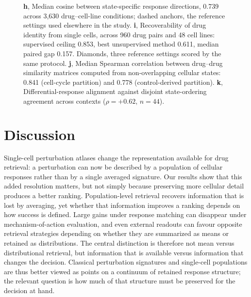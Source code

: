 \documentclass[11pt,letterpaper]{article}
\begin{document}
\begin{figure}[p]
{\textbf{h}, Median cosine between state-specific response directions, 0.739 across 3,630 drug--cell-line conditions; dashed anchors, the reference settings used elsewhere in the study.
\textbf{i}, Recoverability of drug identity from single cells, across 960 drug pairs and 48 cell lines: supervised ceiling 0.853, best unsupervised method 0.611, median paired gap 0.157. Diamonds, three reference settings scored by the same protocol.
\textbf{j}, Median Spearman correlation between drug--drug similarity matrices computed from non-overlapping cellular states: 0.841 (cell-cycle partition) and 0.778 (control-derived partition).
\textbf{k}, Differential-response alignment against disjoint state-ordering agreement across contexts ($\rho=+0.62$, $n=44$).}
\label{fig:5}
\end{figure}
\FloatBarrier   %




\section*{Discussion}

Single-cell perturbation atlases\cite{ref3,dataSciPlex3,Tahoe100M} change the representation available for drug retrieval: a perturbation can now be described by a population of cellular responses rather than by a single averaged signature. Our results show that this added resolution matters, but not simply because preserving more cellular detail produces a better ranking. Population-level retrieval recovers information that is lost by averaging, yet whether that information improves a ranking depends on how success is defined. Large gains under response matching can disappear under mechanism-of-action evaluation, and even external readouts can favour opposite retrieval strategies depending on whether they are summarized as means or retained as distributions. The central distinction is therefore not mean versus distributional retrieval, but information that is available versus information that changes the decision. Classical perturbation signatures and single-cell populations are thus better viewed as points on a continuum of retained response structure; the relevant question is how much of that structure must be preserved for the decision at hand.
\end{document}
